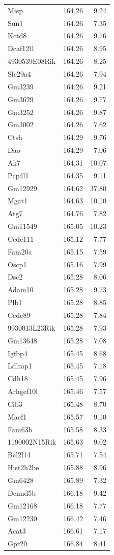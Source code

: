 \documentclass[oneside]{book}\usepackage[]{graphicx}\usepackage[]{color}
\begin{document}
\begin{appendices}
{\begin{longtable}{lrr}
  Misp & 164.26 & 9.24 \\
  Sun1 & 164.26 & 7.35 \\
  Kctd8 & 164.26 & 9.76 \\
  Dcaf12l1 & 164.26 & 8.95 \\
  4930539E08Rik & 164.26 & 8.25 \\
  Slc29a4 & 164.26 & 7.94 \\
  Gm3239 & 164.26 & 9.21 \\
  Gm3629 & 164.26 & 9.77 \\
  Gm3252 & 164.26 & 9.87 \\
  Gm3002 & 164.26 & 7.62 \\
  Ctsh & 164.29 & 9.76 \\
  Dao & 164.29 & 7.06 \\
  Ak7 & 164.31 & 10.07 \\
  Pcp4l1 & 164.35 & 9.11 \\
  Gm12929 & 164.62 & 37.80 \\
  Mgat1 & 164.63 & 10.10 \\
  Atg7 & 164.76 & 7.82 \\
  Gm11549 & 165.05 & 10.23 \\
  Ccdc111 & 165.12 & 7.77 \\
  Fam20a & 165.15 & 7.59 \\
  Oscp1 & 165.16 & 7.99 \\
  Dsc2 & 165.28 & 8.06 \\
  Adam10 & 165.28 & 9.73 \\
  Plb1 & 165.28 & 8.85 \\
  Ccdc89 & 165.28 & 7.84 \\
  9930013L23Rik & 165.28 & 7.93 \\
  Gm13648 & 165.28 & 7.08 \\
  Igfbp4 & 165.45 & 8.68 \\
  Ldlrap1 & 165.45 & 7.18 \\
  Cdh18 & 165.45 & 7.96 \\
  Arhgef10l & 165.46 & 7.57 \\
  Cib3 & 165.48 & 8.70 \\
  Macf1 & 165.57 & 9.10 \\
  Fam63b & 165.58 & 8.33 \\
  1190002N15Rik & 165.63 & 9.02 \\
  Bcl2l14 & 165.71 & 7.54 \\
  Hist2h2be & 165.88 & 8.96 \\
  Gm6428 & 165.89 & 7.32 \\
  Dennd5b & 166.18 & 9.42 \\
  Gm12168 & 166.18 & 7.77 \\
  Gm12230 & 166.42 & 7.46 \\
  Acat3 & 166.61 & 7.17 \\
  Gpr20 & 166.84 & 8.41 \\
   \hline
  

\end{longtable}}
\end{appendices}
\end{document}
